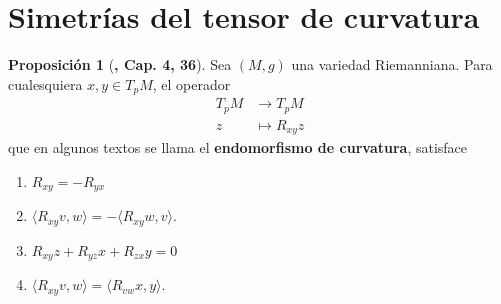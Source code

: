 \documentclass[spanish]{book}
\theoremstyle{definition}
\newtheorem*{prop}{Proposición}
\begin{document}
	\section{Simetrías del tensor de curvatura}
	\begin{prop}[\cite{ONeill}\textbf{, Cap. 4, 36}]
		Sea $(M,g)$ una variedad Riemanniana. Para cualesquiera $x,y\in T_pM$, el operador
		\begin{align*}
			T_pM&\to T_pM\\
			z&\mapsto R_{xy}z
		\end{align*}
		que en algunos textos se llama el \textbf{endomorfismo de curvatura}, satisface
		\begin{enumerate}
			\item $R_{xy}=-R_{yx}$
			\item $\langle R_{xy}v,w\rangle=-\langle R_{xy}w,v\rangle$.
			\item $R_{xy}z+R_{yz}x+R_{zx}y=0$
			\item $\langle R_{xy}v,w\rangle=\langle R_{vw}x,y\rangle$.
		\end{enumerate}
	\end{prop}
\end{document}
